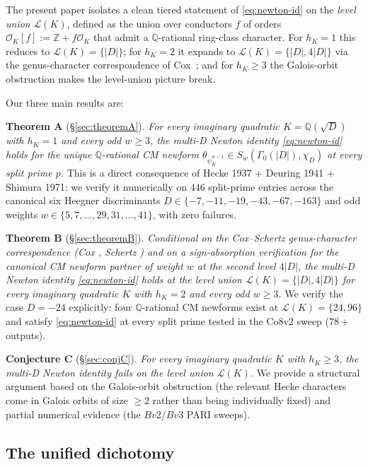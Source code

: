 \documentclass[11pt,a4paper]{amsart}
\theoremstyle{definition}
\newcommand{\Q}{\mathbb{Q}}
\newcommand{\Z}{\mathbb{Z}}
\newcommand{\OK}{\mathcal{O}_K}
\newcommand{\Lcal}{\mathcal{L}}
\newcommand{\hK}{h_{K}}
\begin{document}
The present paper isolates a clean tiered statement of \eqref{eq:newton-id} on the \emph{level union} $\Lcal(K)$, defined as the union over conductors $f$ of orders $\OK[f] := \Z + f\OK$ that admit a $\Q$-rational ring-class character. For $\hK = 1$ this reduces to $\Lcal(K) = \{|D|\}$; for $\hK = 2$ it expands to $\Lcal(K) = \{|D|, 4|D|\}$ via the genus-character correspondence of Cox~\cite{Cox2013}; and for $\hK \ge 3$ the Galois-orbit obstruction makes the level-union picture break.

Our three main results are:

\smallskip\noindent
\textbf{Theorem A} (\S\ref{sec:theoremA}). \emph{For every imaginary quadratic $K = \Q(\sqrt{D})$ with $\hK = 1$ and every odd $w \ge 3$, the multi-D Newton identity \eqref{eq:newton-id} holds for the unique $\Q$-rational CM newform $\theta_{\bar\psi_K^{w-1}} \in S_w(\Gamma_0(|D|), \chi_D)$ at every split prime $p$.} This is a direct consequence of Hecke 1937 + Deuring 1941 + Shimura 1971; we verify it numerically on $446$ split-prime entries across the canonical six Heegner discriminants $D \in \{-7,-11,-19,-43,-67,-163\}$ and odd weights $w \in \{5,7,\ldots,29,31,\ldots,41\}$, with zero failures.

\smallskip\noindent
\textbf{Theorem B} (\S\ref{sec:theoremB}). \emph{Conditional on the Cox--Schertz genus-character correspondence (Cox \cite[Thm.~3.15]{Cox2013}, Schertz \cite[\S6.3]{Schertz2010}) and on a sign-absorption verification for the canonical CM newform partner of weight $w$ at the second level $4|D|$, the multi-D Newton identity \eqref{eq:newton-id} holds at the level union $\Lcal(K) = \{|D|, 4|D|\}$ for every imaginary quadratic $K$ with $\hK = 2$ and every odd $w \ge 3$.} We verify the case $D = -24$ explicitly: four $\Q$-rational CM newforms exist at $\Lcal(K) = \{24, 96\}$ and satisfy \eqref{eq:newton-id} at every split prime tested in the Co8v2 sweep ($78+$ outputs).

\smallskip\noindent
\textbf{Conjecture C} (\S\ref{sec:conjC}). \emph{For every imaginary quadratic $K$ with $\hK \ge 3$, the multi-D Newton identity fails on the level union $\Lcal(K)$.} We provide a structural argument based on the Galois-orbit obstruction (the relevant Hecke characters come in Galois orbits of size $\ge 2$ rather than being individually fixed) and partial numerical evidence (the $Bv2$/$Bv3$ PARI sweeps).

\subsection{The unified dichotomy}\label{sec:dichotomy-intro}
\end{document}
